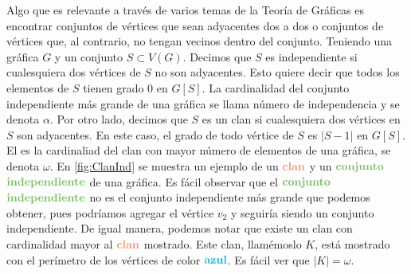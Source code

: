     Algo que es relevante a trav\'es de varios temas de la Teor\'ia de
     Gr\'aficas es encontrar conjuntos de v\'ertices que sean adyacentes dos a
     dos o conjuntos de v\'ertices que, al contrario, no tengan vecinos dentro
     del conjunto. Teniendo una gr\'afica $G$ y un conjunto $S \subset V(G)$.
     Decimos que $S$ es independiente si cualesquiera dos v\'ertices de $S$ no
     son adyacentes. Esto quiere decir que todos los elementos de $S$ tienen
     grado $0$ en $G[S]$. La cardinalidad del conjunto independiente m\'as
     grande de una gr\'afica se llama n\'umero de independencia y se denota
     $\alpha$. Por otro lado, decimos que $S$ es un clan si cualesquiera dos
     v\'ertices en $S$ son adyacentes. En este caso, el grado de todo v\'ertice
     de $S$ es $|S-1|$ en $G[S]$. El  es la cardinaliad
     del clan con mayor n\'umero de elementos de una gr\'afica, se denota
     $\omega$. En \cref{fig:ClanInd} se muestra un ejemplo de un
     ${\color{coral}\bf clan}$ y un ${\color{verde}\bf conjunto}$
     ${\color{verde}\bf independiente}$ de una gr\'afica. Es f\'acil observar
     que el ${\color{verde}\bf conjunto}$ ${\color{verde}\bf independiente}$ no
     es el conjunto independiente m\'as grande que podemos obtener, pues
     podr\'iamos agregar el v\'ertice $v_2$ y seguir\'ia siendo un conjunto
     independiente. De igual manera, podemos notar que existe un clan con
     cardinalidad mayor al ${\color{coral}\bf clan}$ mostrado. Este clan,
     llam\'emoslo $K$, est\'a mostrado con el per\'imetro de los v\'ertices de
     color ${\color{azulCielo}\bf azul}$. Es f\'acil ver que $|K| = \omega$.


